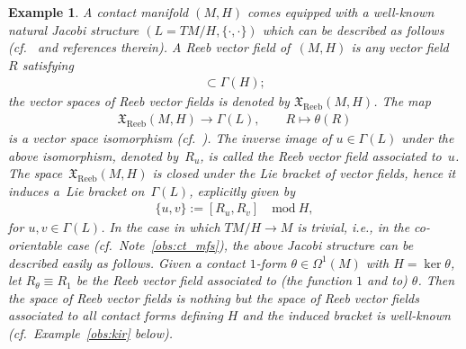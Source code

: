 \documentclass[10pt,a4paper]{amsart}
\numberwithin{equation}{section}
\newtheorem{Example}[Theorem]{Example}
\newcommand{\X}{\ensuremath{\mathfrak{X}}}
\newcommand{\CM}{(M,H)} %
\begin{document}
\begin{Example}\label{exm:ctc_jacobi}
A contact manifold $\CM$ comes equipped with a well-known natural Jacobi structure $(L = T M/H, \{\cdot,\cdot\})$ which can be described as follows (cf.~\cite{Maria-Crainic,Dazord} and references therein). A {\it Reeb vector field} of~$\CM$ is any vector f\/ield~$R$ satisfying
 \begin{gather*}[R,\Gamma(H)]\subset\Gamma(H);\end{gather*}
the vector spaces of Reeb vector f\/ields is denoted by $\X_{\mathrm{Reeb}}(M,H)$. The map
 \begin{gather*} %
 \X_{\mathrm{Reeb}}(M,H) \to \Gamma(L), \qquad R \mapsto \theta(R)
 \end{gather*}
is a vector space isomorphism (cf.\ \cite[Lemma~2.2 and Corollary~2.3]{Maria-Crainic}). The inverse image of $u\in\Gamma(L)$ under the above isomorphism, denoted by~$R_u$, is called the {\it Reeb vector field associated to~$u$}. The space~$\X_{\mathrm{Reeb}}(M,H)$ is closed under the Lie bracket of vector f\/ields, hence it induces a~Lie bracket on~$\Gamma(L)$, explicitly given by
 \begin{gather} \label{eq:2}
 \{u,v\} := [R_u,R_v] \quad \text{mod} \ H,
 \end{gather}
for $u,v \in \Gamma(L)$. In the case in which $TM/H \to M$ is trivial, i.e., in the co-orientable case (cf.\ Note~\ref{obs:ct_mfs}), the above Jacobi structure can be described easily as follows. Given a contact $1$-form $\theta \in \Omega^1(M)$ with $H = \ker \theta$, let $R_{\theta} \equiv R_1$ be {\em the} Reeb vector f\/ield associated to (the function $1$ and to) $\theta$. Then the space of Reeb vector f\/ields is nothing but the space of Reeb vector f\/ields associated to all contact forms def\/ining $H$ and the induced bracket is well-known (cf.\ Example~\ref{obs:kir} below).
\end{Example}
\end{document}
